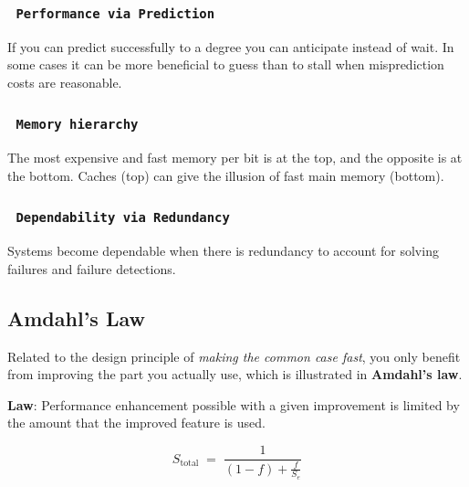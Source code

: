 \documentclass[11pt]{article}
\begin{document}
\subsubsection*{\rightarrow \ \texttt{Performance via Prediction}}
\vspace{-0.5em}

If you can predict successfully to a degree you can anticipate instead of wait. In some cases it can be more beneficial to guess than to stall when misprediction costs are reasonable.

\subsubsection*{\rightarrow \ \texttt{Memory hierarchy}}
\vspace{-0.5em}

The most expensive and fast memory per bit is at the top, and the opposite is at the bottom. Caches (top) can give the illusion of fast main memory (bottom).

\subsubsection*{\rightarrow \ \texttt{Dependability via Redundancy}}
\vspace{-0.5em}
Systems become dependable when there is redundancy to account for solving failures and failure detections.

\subsection*{Amdahl’s Law}

Related to the design principle of \textit{making the common case fast}, you only benefit from improving the part you actually use, which is illustrated in \textbf{Amdahl's law}.

\begin{tcolorbox}[
    enhanced,
    attach boxed title to top left={xshift=6mm,yshift=-1.5mm},
    colback=moonstoneblue!20,
    colframe=moonstoneblue,
    colbacktitle=moonstoneblue,
    title=Amdahl's Law,
    fonttitle=\bfseries\color{white},
    boxed title style={size=small,colframe=moonstoneblue,sharp corners},
    sharp corners,
    label=box:logic-types,
]
    {\color{moondark}\textbf{Law}}: Performance enhancement possible with a given improvement is limited by the amount that the improved feature is used.
\end{tcolorbox}
\vspace{-2em}
$$S_{\text{total}}\;=\;\frac{1}{(1 - f) + \frac{f}{S_e}}$$
\end{document}
